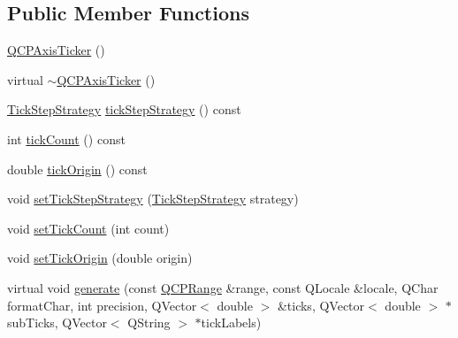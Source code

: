\subsection*{Public Member Functions}
\begin{DoxyCompactItemize}
\item 
\mbox{\hyperlink{class_q_c_p_axis_ticker_a8fcf23c79ebd72202fe79253f9f01ea8}{Q\+C\+P\+Axis\+Ticker}} ()
\item 
virtual \mbox{\hyperlink{class_q_c_p_axis_ticker_a1119d6f09ad720f9c5dfdd2559047161}{$\sim$\+Q\+C\+P\+Axis\+Ticker}} ()
\item 
\mbox{\hyperlink{class_q_c_p_axis_ticker_ab6d2f9d9477821623ac9bc4b21ddf49a}{Tick\+Step\+Strategy}} \mbox{\hyperlink{class_q_c_p_axis_ticker_a58df76f2ec3eb48401bdd314b0e14ba1}{tick\+Step\+Strategy}} () const
\item 
int \mbox{\hyperlink{class_q_c_p_axis_ticker_aaf9edbe4169ce55e216fd067cc139452}{tick\+Count}} () const
\item 
double \mbox{\hyperlink{class_q_c_p_axis_ticker_ac0c6e9587c36fdeefb5518c00fe7ab15}{tick\+Origin}} () const
\item 
void \mbox{\hyperlink{class_q_c_p_axis_ticker_a73b1d847c1a12159af6bfda4ebebe7d5}{set\+Tick\+Step\+Strategy}} (\mbox{\hyperlink{class_q_c_p_axis_ticker_ab6d2f9d9477821623ac9bc4b21ddf49a}{Tick\+Step\+Strategy}} strategy)
\item 
void \mbox{\hyperlink{class_q_c_p_axis_ticker_a47752abba8293e6dc18491501ae34008}{set\+Tick\+Count}} (int count)
\item 
void \mbox{\hyperlink{class_q_c_p_axis_ticker_ab509c7e500293bf66a8409f0d7c23943}{set\+Tick\+Origin}} (double origin)
\item 
virtual void \mbox{\hyperlink{class_q_c_p_axis_ticker_aefbd11725678ca824add8cf926cbc856}{generate}} (const \mbox{\hyperlink{class_q_c_p_range}{Q\+C\+P\+Range}} \&range, const Q\+Locale \&locale, Q\+Char format\+Char, int precision, Q\+Vector$<$ double $>$ \&ticks, Q\+Vector$<$ double $>$ $\ast$sub\+Ticks, Q\+Vector$<$ Q\+String $>$ $\ast$tick\+Labels)
\end{DoxyCompactItemize}
